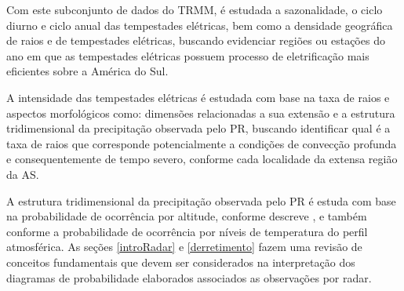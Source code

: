 Com este subconjunto de dados do TRMM, é estudada a sazonalidade, o ciclo diurno e ciclo anual das tempestades elétricas, bem como a densidade geográfica de raios e de tempestades elétricas, buscando evidenciar regiões ou estações do ano em que as tempestades elétricas possuem processo de eletrificação mais eficientes sobre a América do Sul.

A intensidade das tempestades elétricas é estudada com base na taxa de raios e aspectos morfológicos como: dimensões relacionadas a sua extensão e a estrutura tridimensional da precipitação observada pelo PR, buscando identificar qual é a taxa de raios que corresponde potencialmente a condições de convecção profunda e consequentemente de tempo severo, conforme cada localidade da extensa região da AS.

A estrutura tridimensional da precipitação observada pelo PR é estuda com base na probabilidade de ocorrência por altitude, conforme descreve \cite{yuter1995}, e também conforme a probabilidade de ocorrência por níveis de temperatura do perfil atmosférica. As seções \ref{introRadar} e \ref{derretimento} fazem uma revisão de conceitos fundamentais que devem ser considerados na interpretação dos diagramas de probabilidade elaborados associados as observações por radar.
 





